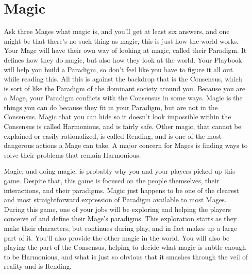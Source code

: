 \documentclass[
  oneside,
  statementpaper,
  9pt]{memoir}
\begin{document}
\newpage

\label{Magic Chapter}

\hypertarget{magic}{%
\chapter{Magic}\label{magic}}

\begin{Player}

Ask three Mages what magic is, and you'll get at least six answers, and one might be that there's no such thing as magic, this is just how the world works. Your Mage will have their own way of looking at magic, called their Paradigm. It defines how they do magic, but also how they look at the world. Your Playbook will help you build a Paradigm, so don't feel like you have to figure it all out while reading this. All this is against the backdrop that is the Consensus, which is sort of like the Paradigm of the dominant society around you. Because you are a Mage, your Paradigm conflicts with the Consensus in some ways. Magic is the things you can do because they fit in your Paradigm, but are not in the Consensus. Magic that you can hide so it doesn't look impossible within the Consensus is called Harmonious, and is fairly safe. Other magic, that cannot be explained or easily rationalized, is called Rending, and is one of the most dangerous actions a Mage can take. A major concern for Mages is finding ways to solve their problems that remain Harmonious.

\end{Player}

\begin{MC}

Magic, and doing magic, is probably why you and your players picked up this game. Despite that, this game is focused on the people themselves, their interactions, and their paradigms. Magic just happens to be one of the clearest and most straightforward expression of Paradigm available to most Mages. During this game, one of your jobs will be exploring and helping the players conceive of and define their Mage's paradigms. This exploration starts as they make their characters, but continues during play, and in fact makes up a large part of it. You'll also provide the other magic in the world. You will also be playing the part of the Consensus, helping to decide what magic is subtle enough to be Harmonious, and what is just so obvious that it smashes through the veil of reality and is Rending.

\end{MC}
\end{document}
